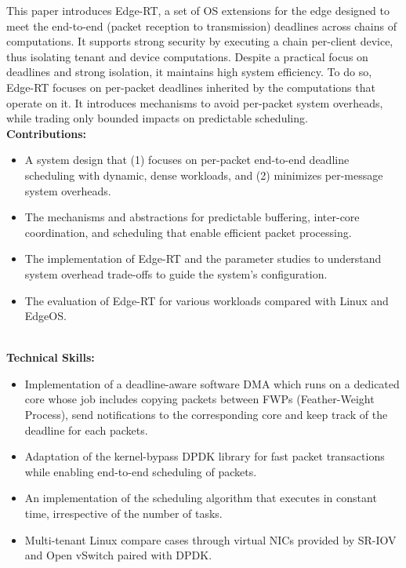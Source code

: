 This paper introduces Edge-RT, a set of OS extensions for the edge designed to meet the end-to-end (packet reception to transmission) deadlines across chains of computations.
It supports strong security by executing a chain per-client device, thus isolating tenant and device computations.
Despite a practical focus on deadlines and strong isolation, it maintains high system efficiency.
To do so, Edge-RT focuses on per-packet deadlines inherited by the computations that operate on it.
It introduces mechanisms to avoid per-packet system overheads, while trading only bounded impacts on predictable scheduling.
\\
\textbf{\small Contributions:}
\begin{itemize}[leftmargin=*]
  \setlength\itemsep{-0.0em}
        \item A system design that (1) focuses on per-packet end-to-end deadline scheduling with dynamic, dense workloads, and (2) minimizes per-message system overheads.
        \item The mechanisms and abstractions for predictable buffering, inter-core coordination, and scheduling that enable efficient packet processing.
        \item The implementation of Edge-RT and the parameter studies to understand system overhead trade-offs to guide the
system’s configuration.
        \item The evaluation of Edge-RT for various workloads compared with Linux and EdgeOS.
\end{itemize}
\vspace{-1.0em}
\
\\
\textbf{\small Technical Skills:}
\begin{itemize}[leftmargin=*]
   \setlength\itemsep{-0.0em}
   	\item Implementation of a deadline-aware software DMA which runs on a dedicated core whose job includes copying packets between FWPs (Feather-Weight Process), send notifications to the corresponding core and keep track of the deadline for each packets.
   	\item Adaptation of the kernel-bypass DPDK library for fast packet transactions while enabling end-to-end scheduling of packets.
	\item An implementation of the scheduling algorithm that executes in constant time, irrespective of the number of tasks.
	\item Multi-tenant Linux compare cases through virtual NICs provided by SR-IOV and Open vSwitch paired with DPDK.
\end{itemize}
